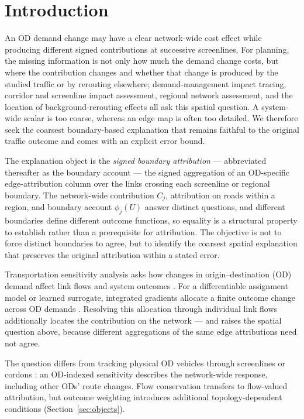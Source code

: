 \documentclass[a4paper,fleqn]{cas-sc}
\begin{document}
\section{Introduction}\label{sec:intro}
An OD demand change may have a clear network-wide cost effect while
producing different signed contributions at successive screenlines. For
planning, the missing information is not only how much the demand change
costs, but where the contribution changes and whether that change is
produced by the studied traffic or by rerouting elsewhere; demand-management
impact tracing, corridor and screenline impact assessment, regional network
assessment, and the location of background-rerouting effects all ask this
spatial question. A system-wide scalar is too coarse, whereas an edge map
is often too detailed. We therefore seek the coarsest boundary-based
explanation that remains faithful to the original traffic outcome and
comes with an explicit error bound.

The explanation object is the \emph{signed boundary attribution} ---
abbreviated thereafter as the boundary account --- the signed aggregation
of an OD-specific edge-attribution column over the links crossing each
screenline or regional boundary. The network-wide contribution $C_j$,
attribution on roads within a region, and boundary account $\phi_j(U)$
answer distinct questions, and different boundaries define different
outcome functions, so equality is a structural property to establish
rather than a prerequisite for attribution. The objective is not to
force distinct boundaries to agree, but to identify the coarsest spatial
explanation that preserves the original attribution within a stated
error.

Transportation sensitivity analysis asks how changes in origin--destination
(OD) demand affect link flows and system outcomes
\citep{tobin1988sensitivity,josefsson2007sensitivity,patriksson2003aggregated}.
For a differentiable assignment model or learned surrogate, integrated
gradients allocate a finite outcome change across OD demands
\citep{sundararajan2017axiomatic}. Resolving this allocation through
individual link flows additionally locates the contribution on the
network --- and raises the spatial question above, because different
aggregations of the same edge attributions need not agree.

The question differs from tracking physical OD vehicles through screenlines
or cordons \citep{sheffi1985urban,vanzuylen1980most,bar2002origin}:
an OD-indexed sensitivity describes the network-wide response,
including other ODs' route changes. Flow conservation transfers to
flow-valued attribution, but outcome weighting introduces additional
topology-dependent conditions (Section~\ref{sec:objects}).
\end{document}
